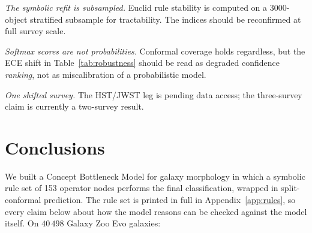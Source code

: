 \documentclass[11pt]{article}
\begin{document}
\emph{The symbolic refit is subsampled.} Euclid rule stability is computed on
a $3000$-object stratified subsample for tractability. The indices should be
reconfirmed at full survey scale.

\emph{Softmax scores are not probabilities.} Conformal coverage holds
regardless, but the ECE shift in Table~\ref{tab:robustness} should be read as
degraded confidence \emph{ranking}, not as miscalibration of a probabilistic
model.

\emph{One shifted survey.} The HST/JWST leg is pending data access; the
three-survey claim is currently a two-survey result.

\section{Conclusions}
\label{sec:conclusions}

We built a Concept Bottleneck Model for galaxy morphology in which a symbolic
rule set of 153 operator nodes performs the final classification, wrapped in
split-conformal prediction. The rule set is printed in full in
Appendix~\ref{app:rules}, so every claim below about how the model reasons can
be checked against the model itself. On $40\,498$ Galaxy Zoo Evo galaxies:
\end{document}
